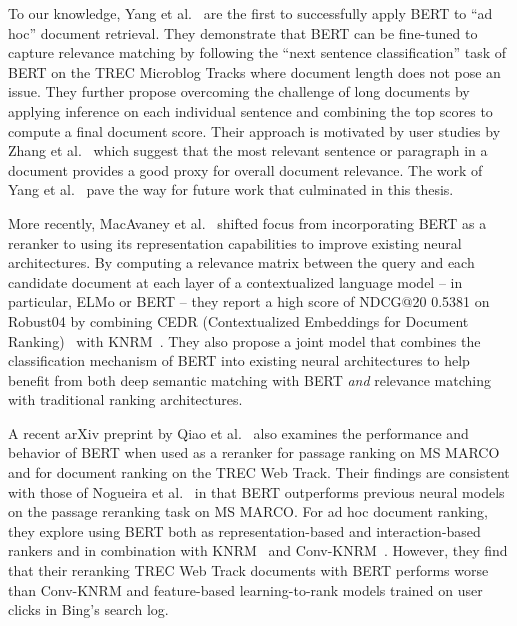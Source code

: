 To our knowledge, Yang et al.~\cite{yang2019simple} are the first to successfully apply BERT to ``ad hoc'' document retrieval.
They demonstrate that BERT can be fine-tuned to capture relevance matching by following the ``next sentence classification'' task of BERT on the TREC Microblog Tracks where document length does not pose an issue.
They further propose overcoming the challenge of long documents by applying inference on each individual sentence and combining the top scores to compute a final document score.
Their approach is motivated by user studies by Zhang et al.~\cite{zhang2018effective} which suggest that the most relevant sentence or paragraph in a document provides a good proxy for overall document relevance.
The work of Yang et al.~\cite{yang2019simple} pave the way for future work that culminated in this thesis.

More recently, MacAvaney et al.~\cite{macavaney2019cedr} shifted focus from incorporating BERT as a reranker to using its representation capabilities to improve existing neural architectures.
By computing a relevance matrix between the query and each candidate document at each layer of a contextualized language model -- in particular, ELMo or BERT --  they report a high score of NDCG@20 0.5381 on Robust04 by combining CEDR (Contextualized Embeddings for Document Ranking)~\cite{macavaney2019cedr} with KNRM~\cite{xiong2017knrm}.
They also propose a joint model that combines the classification mechanism of BERT into existing neural architectures to help benefit from both deep semantic matching with BERT \textit{and} relevance matching with traditional ranking architectures.

A recent arXiv preprint by Qiao et al.~\cite{Qiao:1904.07531:2019} also examines the performance and behavior of BERT when used as a reranker for passage ranking on MS MARCO and for document ranking on the TREC Web Track.
Their findings are consistent with those of Nogueira et al.~\cite{nogueira2019passage} in that BERT outperforms previous neural models on the passage reranking task on MS MARCO.
For ad hoc document ranking, they explore using BERT both as representation-based and interaction-based rankers and in combination with KNRM~\cite{xiong2017knrm} and Conv-KNRM~\cite{dai2018convolutional}.
However, they find that their reranking TREC Web Track documents with BERT performs worse than Conv-KNRM and feature-based learning-to-rank models trained on user clicks in Bing's search log.

